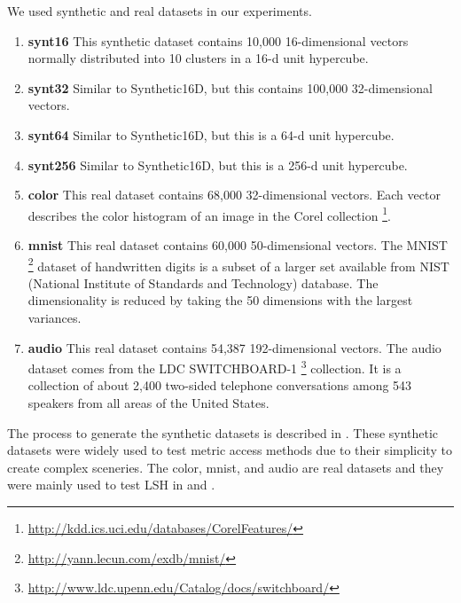 We used synthetic and real datasets in our experiments.
\begin{enumerate}
   \item  \textbf{synt16} This synthetic dataset contains 10,000 16-dimensional vectors normally distributed into 10 clusters  in a 16-d unit hypercube.
   \item \textbf{synt32} Similar to Synthetic16D, but this contains 100,000 32-dimensional vectors.
   \item \textbf{synt64} Similar to Synthetic16D, but this is a 64-d unit hypercube.
   \item \textbf{synt256} Similar to Synthetic16D, but this is a 256-d unit hypercube.
   \item \textbf{color} This real dataset contains 68,000 32-dimensional vectors. Each vector describes the color histogram of an image in the Corel collection \footnote{\url{http://kdd.ics.uci.edu/databases/CorelFeatures/}}.
   \item \textbf{mnist} This real dataset contains 60,000 50-dimensional vectors.  The MNIST \footnote{\url{http://yann.lecun.com/exdb/mnist/}} dataset of handwritten digits is a subset of a larger set available from NIST (National Institute of Standards and Technology)  database.  The dimensionality is reduced by taking the 50 dimensions with the largest variances. %
   \item \textbf{audio} This real dataset contains 54,387 192-dimensional vectors. The audio dataset comes from the LDC SWITCHBOARD-1 \footnote{\url{http://www.ldc.upenn.edu/Catalog/docs/switchboard/}} collection. It is a collection of about 2,400 two-sided telephone conversations among 543 speakers from all areas of the United States.
\end{enumerate}

The process to generate the synthetic datasets is described in \cite{MTree}.   These synthetic datasets were widely used to test metric access methods due to their simplicity to create complex sceneries. The color, mnist, and audio are real datasets and they were mainly used to test LSH  in \cite{lsh} and \cite{multiprobe}. 


